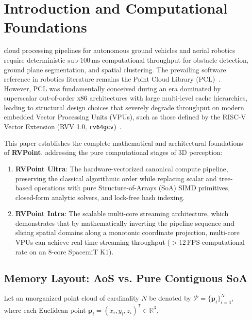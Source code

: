 \documentclass[journal,compsoc]{IEEEtran}
\begin{document}
\maketitle
\IEEEdisplaynontitleabstractindextext
\IEEEpeerreviewmaketitle

\section{Introduction and Computational Foundations}
\label{sec:intro}

 cloud processing pipelines for autonomous ground vehicles and aerial robotics require deterministic sub-$100\,\text{ms}$ computational throughput for obstacle detection, ground plane segmentation, and spatial clustering. The prevailing software reference in robotics literature remains the Point Cloud Library (PCL)~\cite{rusu2011pcl}. However, PCL was fundamentally conceived during an era dominated by superscalar out-of-order x86 architectures with large multi-level cache hierarchies, leading to structural design choices that severely degrade throughput on modern embedded Vector Processing Units (VPUs), such as those defined by the RISC-V Vector Extension (RVV 1.0, \texttt{rv64gcv})~\cite{riscv2021vector}.

This paper establishes the complete mathematical and architectural foundations of \textbf{RVPoint}, addressing the pure computational stages of 3D perception:
\begin{enumerate}
    \item \textbf{RVPoint Ultra}: The hardware-vectorized canonical compute pipeline, preserving the classical algorithmic order while replacing scalar and tree-based operations with pure Structure-of-Arrays (SoA) SIMD primitives, closed-form analytic solvers, and lock-free hash indexing.
    \item \textbf{RVPoint Intra}: The scalable multi-core streaming architecture, which demonstrates that by mathematically inverting the pipeline sequence and slicing spatial domains along a monotonic coordinate projection, multi-core VPUs can achieve real-time streaming throughput ($>12\,\text{FPS}$ computational rate on an 8-core SpacemiT K1).
\end{enumerate}

\subsection{Memory Layout: AoS vs. Pure Contiguous SoA}
Let an unorganized point cloud of cardinality $N$ be denoted by $\mathcal{P} = \{\bm{p}_i\}_{i=1}^N$, where each Euclidean point $\bm{p}_i = (x_i, y_i, z_i)^T \in \mathbb{R}^3$.
\end{document}
